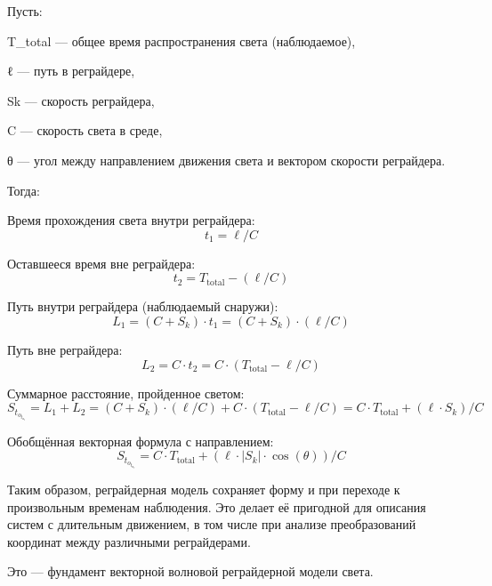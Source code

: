 \documentclass[12pt]{article}
\begin{document}
Пусть:

T_total — общее время распространения света (наблюдаемое),

ℓ — путь в реграйдере,

Sk — скорость реграйдера,

C — скорость света в среде,

θ — угол между направлением движения света и вектором скорости реграйдера.

Тогда:

Время прохождения света внутри реграйдера:
\[
t_1 = \ell / C
\]

Оставшееся время вне реграйдера:
\[
t_2 = T_{\text{total}} - (\ell / C)
\]

Путь внутри реграйдера (наблюдаемый снаружи):
\[
L_1 = (C + S_k) \cdot t_1 = (C + S_k) \cdot (\ell / C)
\]

Путь вне реграйдера:
\[
L_2 = C \cdot t_2 = C \cdot (T_{\text{total}} - \ell / C)
\]

Суммарное расстояние, пройденное светом:
\[
S_t_o_t_a_l = L_1 + L_2 = (C + S_k) \cdot (\ell / C) + C \cdot (T_{\text{total}} - \ell / C) = C \cdot T_{\text{total}} + (\ell \cdot S_k) / C
\]

Обобщённая векторная формула с направлением:
\[
S_t_o_t_a_l = C \cdot T_{\text{total}} + (\ell \cdot \left|S_k\right| \cdot \cos(\theta)) / C
\]

Таким образом, реграйдерная модель сохраняет форму и при переходе к произвольным временам наблюдения. Это делает её пригодной для описания систем с длительным движением, в том числе при анализе преобразований координат между различными реграйдерами.

Это — фундамент векторной волновой реграйдерной модели света.
\end{document}
